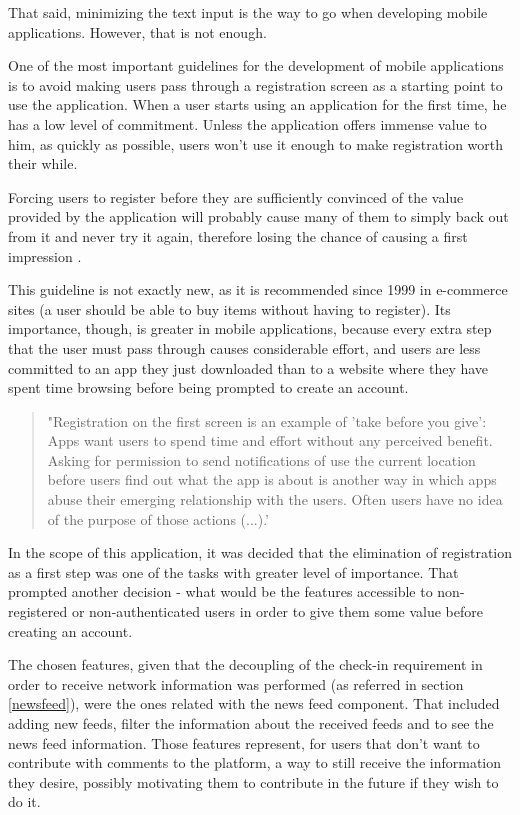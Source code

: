 That said, minimizing the text input is the way to go when developing mobile applications. However, that is not enough.

One of the most important guidelines for the development of mobile applications is to avoid making users pass through a registration screen as a starting point to use the application. 
When a user starts using an application for the first time, he has a low level of commitment. Unless the application offers immense value to him, as quickly as possible, users won't use it enough to make registration worth their while. 

Forcing users to register before they are sufficiently convinced of the value provided by the application will probably cause many of them to simply back out from it and never try it again, therefore losing the chance of causing a first impression \cite{kn: MobileUsab}.

This guideline is not exactly new, as it is recommended since 1999 in e-commerce sites (a user should be able to buy items without having to register). Its importance, though, is greater in mobile applications, because every extra step that the user must pass through causes considerable effort, and users are less committed to an app they just downloaded than to a website where they have spent time browsing before being prompted to create an account.

\begin{quote}
"Registration on the first screen is an example of 'take before you give': Apps want users to spend time and effort without any perceived benefit. Asking for permission to send notifications of use the current location before users find out what the app is about is another way in which apps abuse their emerging relationship with the users. Often users have no idea of the purpose of those actions (...).' \cite{kn: MobileUsab}
\end{quote}


In the scope of this application, it was decided that the elimination of registration as a first step was one of the tasks with greater level of importance. That prompted another decision - what would be the features accessible to non-registered or non-authenticated users in order to give them some value before creating an account. 

The chosen features, given that the decoupling of the check-in requirement in order to receive network information was performed (as referred in section \ref{newsfeed}), were the ones related with the news feed component. That included adding new feeds, filter the information about the received feeds and to see the news feed information. 
Those features represent, for users that don't want to contribute with comments to the platform, a way to still receive the information they desire, possibly motivating them to contribute in the future if they wish to do it.

